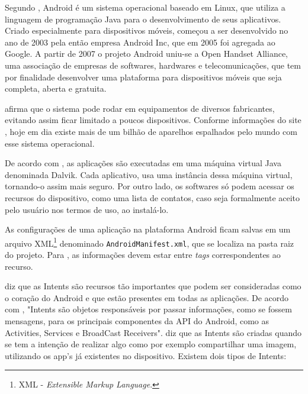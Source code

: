 
	\par Segundo , Android é um sistema operacional
baseado em Linux, que utiliza a linguagem de programação Java para o
desenvolvimento de seus aplicativos. Criado especialmente para dispositivos
móveis, começou a ser desenvolvido no ano de 2003 pela então empresa Android
Inc, que em 2005 foi agregada ao Google. A partir de 2007 o projeto Android
uniu-se a Open Handset Alliance, uma associação de empresas de
softwares, hardwares e telecomunicações, que tem por finalidade desenvolver uma
plataforma para dispositivos móveis que seja completa, aberta e gratuita.

	\par {} afirma que o sistema pode rodar em equipamentos
de diversos fabricantes, evitando assim ficar limitado a poucos dispositivos.
Conforme informações do site , hoje em dia existe mais de
um bilhão de aparelhos espalhados pelo mundo com esse sistema operacional.

	\par De acordo com , as aplicações são executadas em
uma máquina virtual Java denominada Dalvik. Cada aplicativo, usa uma instância
dessa máquina virtual, tornando-o assim mais seguro. Por outro lado, os
softwares só podem acessar os recursos do dispositivo, como uma lista de
contatos, caso seja formalmente aceito pelo usuário nos termos de uso, ao
instalá-lo.

	\par As configurações de uma aplicação na plataforma Android ficam salvas em um
arquivo XML\footnote{XML - \textit{Extensible Markup Language}.} denominado
\texttt{AndroidManifest.xml}, que se localiza na pasta raiz do projeto. Para
, as informações devem estar entre \textit{tags}
correspondentes ao recurso.

	\par {} diz que as Intents são recursos tão importantes
que podem ser consideradas como o coração do Android e que estão presentes em
todas as aplicações.	De acordo com , "Intents são
objetos responsáveis por passar informações, como se fossem mensagens, para os
principais componentes da API do Android, como as Activities, Services e
BroadCast Receivers".  diz que as Intents são criadas
quando se tem a intenção de realizar algo como por exemplo compartilhar uma
imagem, utilizando os app's já existentes no dispositivo. Existem dois tipos de
Intents:
	
